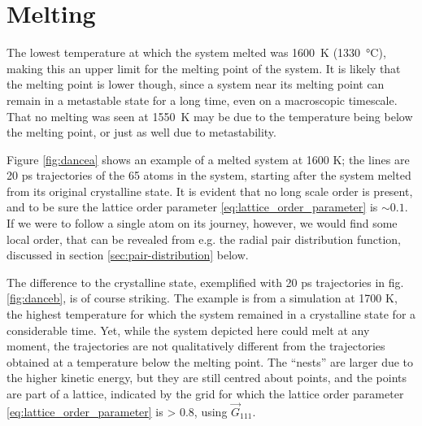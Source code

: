 \documentclass[11pt,bibliography=totoc,index=totoc]{scrbook}   %
\begin{document}

%
\section{Melting}
%


The lowest temperature at which the system melted was \SI{1600}{\kelvin} (\SI{1330}{\celsius}), making this an upper limit for the melting point of the system. 
It is likely that the melting point is lower though, since a system near its melting point can remain in a metastable state for a long time, even on a macroscopic timescale.
That no melting was seen at \SI{1550}{\kelvin} may be due to the temperature being below the melting point, 
or just as well due to metastability.

Figure \ref{fig:dancea} shows an example of a melted system at 1600 K; the lines are 20 ps trajectories of the 65 atoms in the system, starting after the system melted from its original crystalline state. 
It is evident that no long scale order is present, and to be sure the lattice order parameter \eqref{eq:lattice_order_parameter} is $\sim 0.1$. If we were to follow a single atom on its journey, however, we would find some local order, 
that can be revealed from e.g. the radial pair distribution function, discussed in section \ref{sec:pair-distribution} below.

The difference to the crystalline state, exemplified with 20 ps trajectories in fig. \ref{fig:danceb}, is of course striking. 
The example is from a simulation at 1700 K, the highest temperature for which the system remained in a crystalline state for a considerable time.
Yet, while the system depicted here could melt at any moment, the trajectories are not qualitatively different from the trajectories obtained at a temperature below the melting point. The ``nests'' are larger due to the higher kinetic energy, but they are still centred about points, and the points are part of a lattice, indicated by the grid for which the lattice order parameter \eqref{eq:lattice_order_parameter} is > 0.8, using $\vec{G}_{111}$. 
\end{document}
